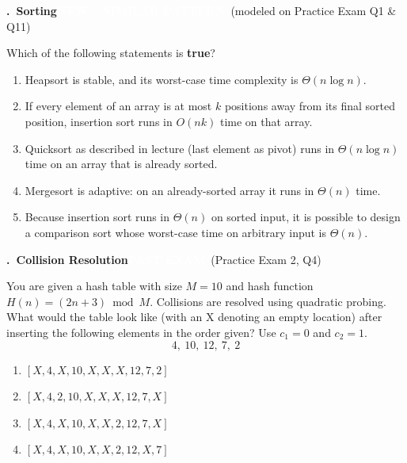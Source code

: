 \documentclass[11pt]{article}
\newcounter{qnum}
\newcommand{\tagpast}[1]{\colorbox{pastc}{\textcolor{white}{\footnotesize\textbf{PAST EXAM}}}\ {\footnotesize\textcolor{pastc}{(#1)}}}
\newcommand{\tagnew}[1]{\colorbox{newc}{\textcolor{white}{\footnotesize\textbf{NEW -- SIMILAR PATTERN}}}\ {\footnotesize\textcolor{newc}{(modeled on #1)}}}
\newcommand{\question}[2]{\par\needspace{8\baselineskip}\medskip\stepcounter{qnum}%
  \noindent\textbf{\theqnum.\ #1}\hfill #2\par\nobreak\smallskip}
\newenvironment{choices}{\begin{enumerate}[label=\textbf{\Alph*)}, nosep, leftmargin=2.5em]}{\end{enumerate}}
\begin{document}
\question{Sorting}{\tagnew{Practice Exam Q1 \& Q11}}
Which of the following statements is \textbf{true}?
\begin{choices}
  \item Heapsort is stable, and its worst-case time complexity is $\Theta(n\log n)$.
  \item If every element of an array is at most $k$ positions away from its final sorted position,
        insertion sort runs in $O(nk)$ time on that array.
  \item Quicksort as described in lecture (last element as pivot) runs in $\Theta(n\log n)$ time on an
        array that is already sorted.
  \item Mergesort is adaptive: on an already-sorted array it runs in $\Theta(n)$ time.
  \item Because insertion sort runs in $\Theta(n)$ on sorted input, it is possible to design a comparison
        sort whose worst-case time on arbitrary input is $\Theta(n)$.
\end{choices}

\question{Collision Resolution}{\tagpast{Practice Exam 2, Q4}}
You are given a hash table with size $M = 10$ and hash function $H(n) = (2n + 3) \bmod M$. Collisions
are resolved using quadratic probing. What would the table look like (with an X denoting an empty
location) after inserting the following elements in the order given? Use $c_1 = 0$ and $c_2 = 1$.
\[ 4,\ 10,\ 12,\ 7,\ 2 \]
\begin{choices}
  \item $[X, 4, X, 10, X, X, X, 12, 7, 2]$
  \item $[X, 4, 2, 10, X, X, X, 12, 7, X]$
  \item $[X, 4, X, 10, X, X, 2, 12, 7, X]$
  \item $[X, 4, X, 10, X, X, 2, 12, X, 7]$
\end{choices}
\end{document}
